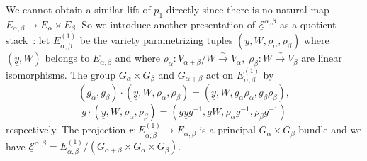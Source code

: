 \documentclass[a4paper,10pt]{amsart}
\def\a{\alpha}
\numberwithin{equation}{section}
\begin{document}
We cannot  obtain a similar lift of $p_1$ directly since there is no natural map $E_{\alpha,\beta} \to E_{\alpha} \times E_{\beta}$. So we introduce another presentation of
$\underline{\mathcal{E}}^{\alpha, \beta}$ as a quotient stack~: let ${E}^{(1)}_{\alpha,\beta}$ be the variety parametrizing tuples $(\underline{y},W,\rho_{\alpha},\rho_{\beta})$ where $(\underline{y},W)$ belongs to $E_{\alpha,\beta}$ and where $\rho_{\alpha}: V_{\a+\beta}/W \stackrel{\sim}{\to} V_{\alpha}, \; \rho_{\beta}: W \stackrel{\sim}{\to} V_{\beta}$ are linear isomorphisms.
The group $G_{\alpha} \times G_{\beta}$ and $G_{\alpha+\beta}$ act on ${E}^{(1)}_{\alpha,\beta}$ by
$$(g_{\alpha}, g_{\beta}) \cdot (\underline{y}, W, \rho_{\alpha}, \rho_{\beta})=(\underline{y}, W, g_{\alpha} \rho_{\alpha}, g_{\beta}\rho_{\beta}),$$
$$g \cdot (\underline{y}, W, \rho_{\alpha}, \rho_{\beta})=(g \underline{y} g^{-1}, g W, \rho_{\alpha} g^{-1}, \rho_{\beta} g^{-1})$$
respectively. The projection $r:{E}^{(1)}_{\alpha,\beta} \to E_{\alpha, \beta}$ is a principal $G_{\alpha} \times G_{\beta}$-bundle and we have $\underline{\mathcal{E}}^{\alpha, \beta}={E}^{(1)}_{\alpha,\beta}/(G_{\alpha+\beta} \times G_{\alpha} \times G_{\beta})$. 
\end{document}
